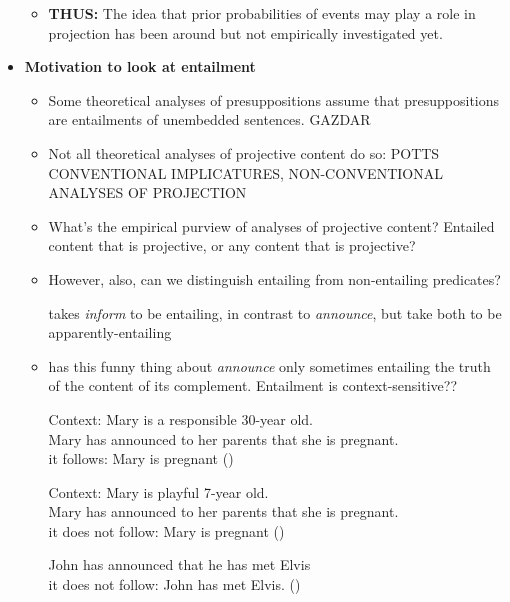 \documentclass[11pt,fleqn]{article}
\newcommand{\6}{\mbox{$[\hspace*{-.6mm}[$}}
\newcommand{\9}{\mbox{$]\hspace*{-.6mm}]$}}
\begin{document}
\begin{itemize}
\begin{itemize}
\item {\bf THUS:} The idea that prior probabilities of events may play a role in projection has been around but not empirically investigated yet.

\end{itemize}

\item {\bf Motivation to look at entailment}

\begin{itemize}

\item Some theoretical analyses of presuppositions assume that presuppositions are entailments of unembedded sentences. GAZDAR

\item Not all theoretical analyses of projective content do so: POTTS CONVENTIONAL IMPLICATURES, NON-CONVENTIONAL ANALYSES OF PROJECTION

\item What's the empirical purview of analyses of projective content? Entailed content that is projective, or any content that is projective?

\item However, also, can we distinguish entailing from non-entailing predicates? 

\citealt{schlenker10} takes {\em inform} to be entailing, in contrast to {\em announce}, but \citealt{anand-hacquard2014} take both to be apparently-entailing

\item \citealt{schlenker10} has this funny thing about {\em announce} only sometimes entailing the truth of the content of its complement. Entailment is context-sensitive??

\begin{exe}
\ex 
\begin{xlist}
\ex Context: Mary is a responsible 30-year old. 
\\ Mary has announced to her parents that she is pregnant. 
\\ it follows: Mary is pregnant \hfill (\citealt[139]{schlenker10})

\ex Context: Mary is playful 7-year old.
\\ Mary has announced to her parents that she is pregnant. 
\\ it does not follow: Mary is pregnant \hfill (\citealt[140]{schlenker10})

\ex John has announced that he has met Elvis
\\ it does not follow: John has met Elvis. \hfill (\citealt[140]{schlenker10})
\end{xlist}
\end{exe}


\end{itemize}
\end{itemize}
\end{document}
